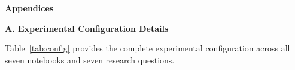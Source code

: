 \documentclass[12pt, a4paper]{report}
\begin{document}
\appendix
\clearpage
{}
{}

{\fontsize{24pt}{28pt}\selectfont\bfseries Appendices\par}
\vspace{12pt}

{\fontsize{24pt}{28pt}\selectfont\bfseries A. Experimental Configuration Details\par}
\label{app:config}
\vspace{8pt}

Table~\ref{tab:config} provides the complete experimental configuration across
all seven notebooks and seven research questions.
\end{document}
